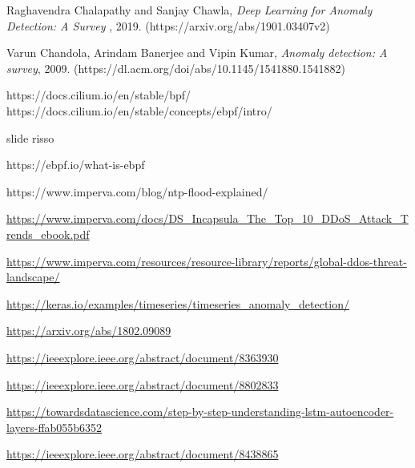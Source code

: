 \begin{thebibliography}{9}
     Raghavendra Chalapathy and  Sanjay Chawla, {\em Deep Learning for Anomaly Detection: A Survey }, 2019. (https://arxiv.org/abs/1901.03407v2)
    
     Varun Chandola, Arindam Banerjee and Vipin Kumar, {\em Anomaly detection: A survey}, 2009. (https://dl.acm.org/doi/abs/10.1145/1541880.1541882)
    
     https://docs.cilium.io/en/stable/bpf/
     https://docs.cilium.io/en/stable/concepts/ebpf/intro/

     slide risso
     
     https://ebpf.io/what-is-ebpf

     https://www.imperva.com/blog/ntp-flood-explained/

     \url{https://www.imperva.com/docs/DS_Incapsula_The_Top_10_DDoS_Attack_Trends_ebook.pdf}
    
     \url{https://www.imperva.com/resources/resource-library/reports/global-ddos-threat-landscape/}

     \url{https://keras.io/examples/timeseries/timeseries_anomaly_detection/}

     \url{https://arxiv.org/abs/1802.09089}

     \url{https://ieeexplore.ieee.org/abstract/document/8363930}

     \url{https://ieeexplore.ieee.org/abstract/document/8802833}

     \url{https://towardsdatascience.com/step-by-step-understanding-lstm-autoencoder-layers-ffab055b6352}

     \url{https://ieeexplore.ieee.org/abstract/document/8438865}





\end{thebibliography}
